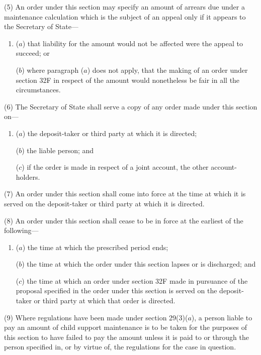 \documentclass[a4paper]{article}
\begin{document}
(5) An order under this section may specify an amount of arrears due under a maintenance calculation which is the subject of an appeal only if it appears to the Secretary of State---
\begin{enumerate}\item[]
($a$) that liability for the amount would not be affected were the appeal to succeed; or

($b$) where paragraph ($a$) does not apply, that the making of an order under section 32F in respect of the amount would nonetheless be fair in all the circumstances.
\end{enumerate}

(6) The Secretary of State shall serve a copy of any order made under this section on---
\begin{enumerate}\item[]
($a$)
the deposit-taker or third party at which it is directed;

($b$)
the liable person; and

($c$)
if the order is made in respect of a joint account, the other account-holders.
\end{enumerate}

(7) An order under this section shall come into force at the time at which it is served on the deposit-taker or third party at which it is directed.

(8) An order under this section shall cease to be in force at the earliest of the following---
\begin{enumerate}\item[]
($a$)
the time at which the prescribed period ends;

($b$)
the time at which the order under this section lapses or is discharged; and

($c$)
the time at which an order under section 32F made in pursuance of the proposal specified in the order under this section is served on the deposit-taker or third party at which that order is directed.
\end{enumerate}

(9) Where regulations have been made under section 29(3)($a$), a person liable to pay an amount of child support maintenance is to be taken for the purposes of this section to have failed to pay the amount unless it is paid to or through the person specified in, or by virtue of, the regulations for the case in question.


\end{document}
